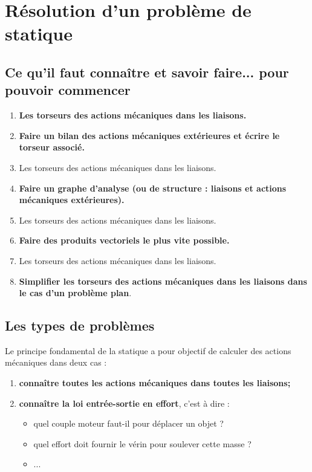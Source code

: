 \def\xxactivite{Cours}
\def\xxauteur{\textsl{Xavier Pessoles}}

\fichetrue
\proftrue
\tdfalse
{}
\setchapterpreamble[u]{\margintoc}

\chapter{Résolution d'un problème de statique}



\setcounter{section}{0}
\section{Ce qu'il faut connaître et savoir faire... pour pouvoir commencer}
\begin{enumerate}
\item \textbf{Les torseurs des actions mécaniques dans les liaisons.}
\item \textbf{Faire un bilan des actions mécaniques extérieures et écrire le torseur associé.}
\item Les torseurs des actions mécaniques dans les liaisons.
\item \textbf{Faire un graphe d'analyse (ou de structure : liaisons et actions mécaniques extérieures).}
\item Les torseurs des actions mécaniques dans les liaisons.
\item \textbf{Faire des produits vectoriels le plus vite possible.}
\item Les torseurs des actions mécaniques dans les liaisons.
\item \textbf{Simplifier les torseurs des actions mécaniques dans les liaisons dans le cas d'un problème plan}.
\end{enumerate}



\section{Les types de problèmes}

Le principe fondamental de la statique a pour objectif de calculer des actions mécaniques dans deux cas :
\begin{enumerate}
\item \textbf{connaître toutes les actions mécaniques dans toutes les liaisons;}
\item \textbf{connaître la loi entrée-sortie en effort}, c'est à dire :
\begin{itemize}
\item quel couple moteur faut-il pour déplacer un objet ?
\item quel effort doit fournir le vérin pour soulever cette masse ?
\item ...
\end{itemize}
\end{enumerate}

